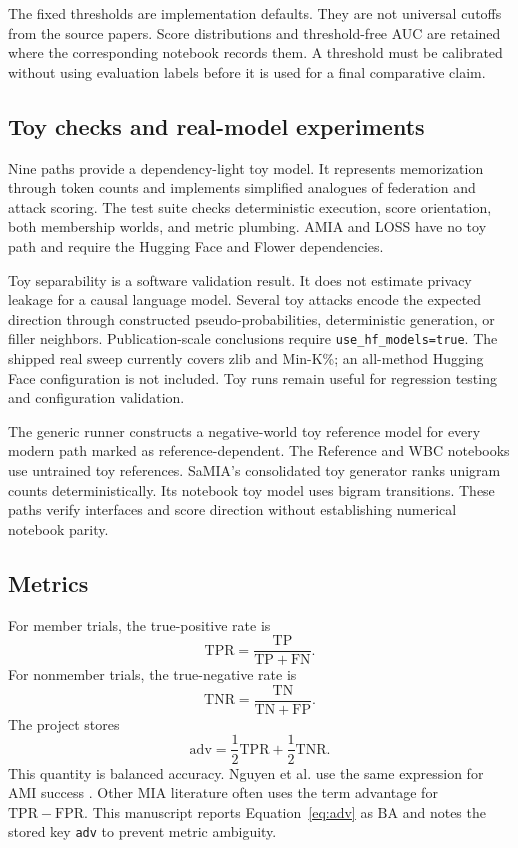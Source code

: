 \documentclass[11pt]{article}
\begin{document}
The fixed thresholds are implementation defaults. They are not universal cutoffs from the source papers. Score distributions and threshold-free AUC are retained where the corresponding notebook records them. A threshold must be calibrated without using evaluation labels before it is used for a final comparative claim.

\subsection{Toy checks and real-model experiments}

Nine paths provide a dependency-light toy model. It represents memorization through token counts and implements simplified analogues of federation and attack scoring. The test suite checks deterministic execution, score orientation, both membership worlds, and metric plumbing. AMIA and LOSS have no toy path and require the Hugging Face and Flower dependencies.

Toy separability is a software validation result. It does not estimate privacy leakage for a causal language model. Several toy attacks encode the expected direction through constructed pseudo-probabilities, deterministic generation, or filler neighbors. Publication-scale conclusions require \texttt{use\_hf\_models=true}. The shipped real sweep currently covers zlib and Min-K\%; an all-method Hugging Face configuration is not included. Toy runs remain useful for regression testing and configuration validation.

The generic runner constructs a negative-world toy reference model for every modern path marked as reference-dependent. The Reference and WBC notebooks use untrained toy references. SaMIA's consolidated toy generator ranks unigram counts deterministically. Its notebook toy model uses bigram transitions. These paths verify interfaces and score direction without establishing numerical notebook parity.

\subsection{Metrics}

For member trials, the true-positive rate is
\begin{equation}
    \mathrm{TPR}=\frac{\mathrm{TP}}{\mathrm{TP}+\mathrm{FN}}.
\end{equation}
For nonmember trials, the true-negative rate is
\begin{equation}
    \mathrm{TNR}=\frac{\mathrm{TN}}{\mathrm{TN}+\mathrm{FP}}.
\end{equation}
The project stores
\begin{equation}
    \mathrm{adv}=\frac{1}{2}\mathrm{TPR}+\frac{1}{2}\mathrm{TNR}.
    \label{eq:adv}
\end{equation}
This quantity is balanced accuracy. Nguyen et al. use the same expression for AMI success \citep{nguyen2023active}. Other MIA literature often uses the term advantage for $\mathrm{TPR}-\mathrm{FPR}$. This manuscript reports Equation~\ref{eq:adv} as $\mathrm{BA}$ and notes the stored key \texttt{adv} to prevent metric ambiguity.
\end{document}
